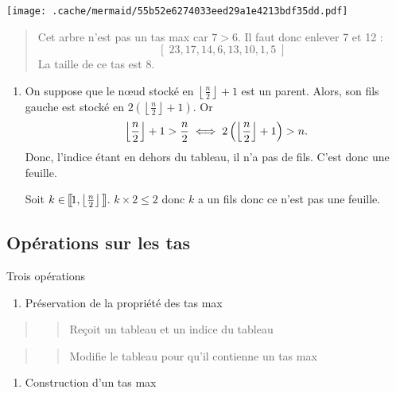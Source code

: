 \texttt{[image: .cache/mermaid/55b52e6274033eed29a1e4213bdf35dd.pdf]}

\begin{quote}
Cet arbre n'est pas un tas max car \(7 > 6\). Il faut donc enlever 7 et
12 : \[ [\;23, 17, 14, 6, 13, 10, 1, 5\;] \] La taille de ce tas est 8.
\end{quote}

\begin{enumerate}
\def\labelenumi{\arabic{enumi}.}
\setcounter{enumi}{2}
\item
  On suppose que le nœud stocké en
  \(\left\lfloor \frac{n}{2} \right\rfloor + 1\) est un parent. Alors,
  son fils gauche est stocké en
  \(2\left(\left\lfloor \frac{n}{2} \right\rfloor + 1\right)\). Or
  \[ \left\lfloor \frac{n}{2} \right\rfloor + 1 > {n \over 2} \iff 2\left(\left\lfloor \frac{n}{2}\right\rfloor + 1\right) > n. \]
  Donc, l'indice étant en dehors du tableau, il n'a pas de fils. C'est
  donc une feuille.

  Soit
  \(k \in \left[\kern-2mm\left[ 1, \left\lfloor {n \over 2} \right\rfloor\;\; \kern-1mm\right]\kern-2mm\right]\).
  \(k \times 2 \leqslant 2\) donc \(k\) a un fils donc ce n'est pas une
  feuille.
\end{enumerate}

\hypertarget{opuxe9rations-sur-les-tas}{%
\subsection{Opérations sur les tas}\label{opuxe9rations-sur-les-tas}}

Trois opérations

\begin{enumerate}
\def\labelenumi{\arabic{enumi}.}
\tightlist
\item
  Préservation de la propriété des tas max
\end{enumerate}

\begin{quote}
\begin{quote}
Reçoit un tableau et un indice du tableau
\end{quote}
\end{quote}

\begin{quote}
\begin{quote}
Modifie le tableau pour qu'il contienne un tas max
\end{quote}
\end{quote}

\begin{enumerate}
\def\labelenumi{\arabic{enumi}.}
\setcounter{enumi}{1}
\tightlist
\item
  Construction d'un tas max
\end{enumerate}

